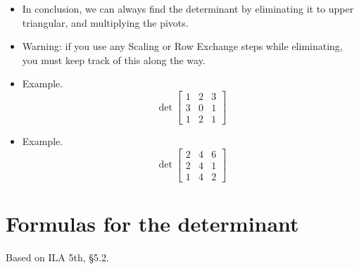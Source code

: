 \documentclass[11pt,oneside]{amsbook}
\theoremstyle{definition}
\theoremstyle{plain}
\theoremstyle{definition}
\theoremstyle{remark}
\numberwithin{equation}{section}
\numberwithin{figure}{section}
\begin{document}
\begin{itemize}
  \begin{itemize}
  \item The determinant of a diagonal matrix is the product of its diagonal entries. To see this we use the Scaling rule repeatedly plus the Identity rule.
    \[\det\begin{bmatrix}d_1&&\\&d_2&\\&&\ddots\end{bmatrix}
      =d_1\det\begin{bmatrix}1&&\\&d_2&\\&&\ddots\end{bmatrix}
      =\cdots=d_1d_2\cdots d_n
    \]
  \item The determinant of an upper triangular matrix is the product of its diagonal entries too. To see this note that if the determinant is not zero, it has all its pivots and you can use elimination steps to make it diagonal. Then apply the previous rule.
  \item The determinant of any matrix is the product of its pivots.
  \end{itemize}
\item In conclusion, we can always find the determinant by eliminating it to upper triangular, and multiplying the pivots.
\item Warning: if you use any Scaling or Row Exchange steps while eliminating, you must keep track of this along the way.
\item Example.
  \[\det\begin{bmatrix}1&2&3\\3&0&1\\1&2&1\end{bmatrix}
  \]
\item Example.
  \[\det\begin{bmatrix}2&4&6\\2&4&1\\1&4&2\end{bmatrix}
  \]
\end{itemize}

\newpage
\section{Formulas for the determinant}

Based on ILA 5th, \S 5.2.
\end{document}
